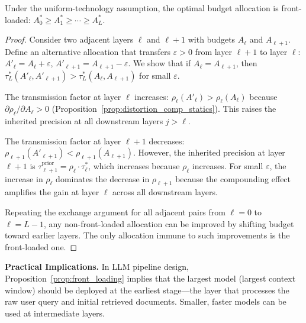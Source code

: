 \begin{proposition}\label{prop:front_loading}
Under the uniform-technology assumption, the optimal budget allocation is front-loaded: $A^*_0 \geq A^*_1 \geq \cdots \geq A^*_L$.
\end{proposition}

\begin{proof}
Consider two adjacent layers $\ell$ and $\ell+1$ with budgets $A_\ell$ and $A_{\ell+1}$. Define an alternative allocation that transfers $\varepsilon > 0$ from layer $\ell+1$ to layer $\ell$: $A'_\ell = A_\ell + \varepsilon$, $A'_{\ell+1} = A_{\ell+1} - \varepsilon$. We show that if $A_\ell = A_{\ell+1}$, then $\tau^*_L(A'_\ell, A'_{\ell+1}) > \tau^*_L(A_\ell, A_{\ell+1})$ for small $\varepsilon$.

The transmission factor at layer $\ell$ increases: $\rho_\ell(A'_\ell) > \rho_\ell(A_\ell)$ because $\partial \rho_\ell / \partial A_\ell > 0$ (Proposition~\ref{prop:distortion_comp_statics}). This raises the inherited precision at all downstream layers $j > \ell$.

The transmission factor at layer $\ell+1$ decreases: $\rho_{\ell+1}(A'_{\ell+1}) < \rho_{\ell+1}(A_{\ell+1})$. However, the inherited precision at layer $\ell+1$ is $\tau^{\text{prior}}_{\ell+1} = \rho_\ell \cdot \tau^*_\ell$, which increases because $\rho_\ell$ increases. For small $\varepsilon$, the increase in $\rho_\ell$ dominates the decrease in $\rho_{\ell+1}$ because the compounding effect amplifies the gain at layer $\ell$ across all downstream layers.

Repeating the exchange argument for all adjacent pairs from $\ell = 0$ to $\ell = L-1$, any non-front-loaded allocation can be improved by shifting budget toward earlier layers. The only allocation immune to such improvements is the front-loaded one.
\end{proof}

\vspace{1em}
\noindent\textbf{Practical Implications.}
In LLM pipeline design, Proposition~\ref{prop:front_loading} implies that the largest model (largest context window) should be deployed at the earliest stage---the layer that processes the raw user query and initial retrieved documents. Smaller, faster models can be used at intermediate layers.


